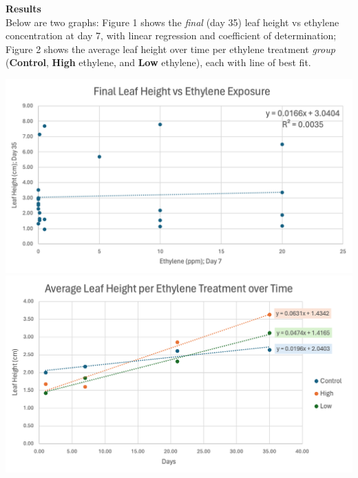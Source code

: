 \documentclass{report}
\newenvironment{minifig}
  {\noindent\minipage{\linewidth}}
  {\endminipage}
\begin{document}
\begin{multicols}{3}
  \textbf{Results}\\
  Below are two graphs: Figure 1 shows the \textit{final} (day 35) leaf height vs ethylene concentration at day 7, with linear regression and coefficient of determination; Figure 2 shows the average leaf height over time per ethylene treatment \textit{group} (\textbf{Control}, \textbf{High} ethylene, and \textbf{Low} ethylene), each with line of best fit.

  \begin{minifig}
    \centering
    \includegraphics[width=\linewidth]{graph2.png}
    \medskip
  \end{minifig}
  \vfill\null
  \columnbreak
  \begin{minifig}
    \medskip
    \centering
    \includegraphics[width=\linewidth]{graph1.png}
  \end{minifig}


\end{multicols}
\end{document}
